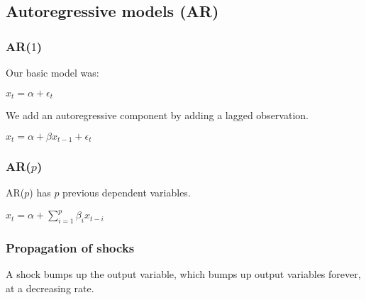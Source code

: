 
\subsection{Autoregressive models (AR)}

\subsubsection{AR(\(1\))}

Our basic model was:

\(x_t=\alpha + \epsilon_t \)

We add an autoregressive component by adding a lagged observation.

\(x_t=\alpha + \beta x_{t-1}+\epsilon_t\)

\subsubsection{AR(\(p\))}

AR(\(p\)) has \(p\) previous dependent variables.

\(x_t=\alpha + \sum_{i=1}^p\beta_ix_{t-i}\)

\subsubsection{Propagation of shocks}

A shock bumps up the output variable, which bumps up output variables forever, at a decreasing rate.



